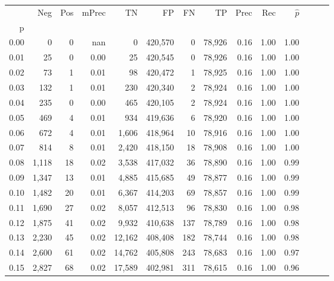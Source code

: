 \begin{tabular}{rrrrrrrrrrrrrr}
\toprule
{} &    Neg &    Pos & mPrec &       TN &       FP &      FN &      TP &  Prec &   Rec & $\hat{p}$ \\
p    &        &        &       &          &          &         &         &       &       &           \\
\midrule
0.00 &      0 &      0 &   nan &        0 &  420,570 &       0 &  78,926 &  0.16 &  1.00 &      1.00 \\
0.01 &     25 &      0 &  0.00 &       25 &  420,545 &       0 &  78,926 &  0.16 &  1.00 &      1.00 \\
0.02 &     73 &      1 &  0.01 &       98 &  420,472 &       1 &  78,925 &  0.16 &  1.00 &      1.00 \\
0.03 &    132 &      1 &  0.01 &      230 &  420,340 &       2 &  78,924 &  0.16 &  1.00 &      1.00 \\
0.04 &    235 &      0 &  0.00 &      465 &  420,105 &       2 &  78,924 &  0.16 &  1.00 &      1.00 \\
0.05 &    469 &      4 &  0.01 &      934 &  419,636 &       6 &  78,920 &  0.16 &  1.00 &      1.00 \\
0.06 &    672 &      4 &  0.01 &    1,606 &  418,964 &      10 &  78,916 &  0.16 &  1.00 &      1.00 \\
0.07 &    814 &      8 &  0.01 &    2,420 &  418,150 &      18 &  78,908 &  0.16 &  1.00 &      1.00 \\
0.08 &  1,118 &     18 &  0.02 &    3,538 &  417,032 &      36 &  78,890 &  0.16 &  1.00 &      0.99 \\
0.09 &  1,347 &     13 &  0.01 &    4,885 &  415,685 &      49 &  78,877 &  0.16 &  1.00 &      0.99 \\
0.10 &  1,482 &     20 &  0.01 &    6,367 &  414,203 &      69 &  78,857 &  0.16 &  1.00 &      0.99 \\
0.11 &  1,690 &     27 &  0.02 &    8,057 &  412,513 &      96 &  78,830 &  0.16 &  1.00 &      0.98 \\
0.12 &  1,875 &     41 &  0.02 &    9,932 &  410,638 &     137 &  78,789 &  0.16 &  1.00 &      0.98 \\
0.13 &  2,230 &     45 &  0.02 &   12,162 &  408,408 &     182 &  78,744 &  0.16 &  1.00 &      0.98 \\
0.14 &  2,600 &     61 &  0.02 &   14,762 &  405,808 &     243 &  78,683 &  0.16 &  1.00 &      0.97 \\
0.15 &  2,827 &     68 &  0.02 &   17,589 &  402,981 &     311 &  78,615 &  0.16 &  1.00 &      0.96 \\

\end{tabular}
